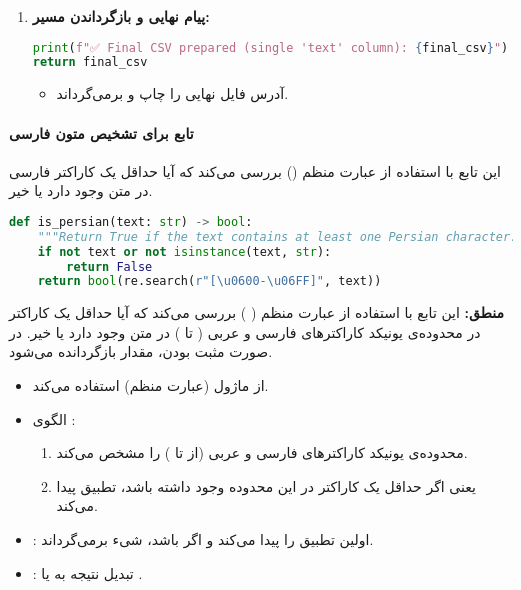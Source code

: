 \documentclass{article}
\begin{document}
\begin{enumerate}
    \item \textbf{پیام نهایی و بازگرداندن مسیر:}
    \begin{latin}
    \begin{lstlisting}[language=Python]
print(f"✅ Final CSV prepared (single 'text' column): {final_csv}")
return final_csv
    \end{lstlisting}
    \end{latin}
    \begin{itemize}
        \item آدرس فایل نهایی را چاپ و برمی‌گرداند.
    \end{itemize}
\end{enumerate}

\paragraph{تابع  برای تشخیص متون فارسی}

این تابع با استفاده از عبارت منظم () بررسی می‌کند که آیا حداقل یک کاراکتر فارسی در متن وجود دارد یا خیر.

\begin{latin}
\begin{lstlisting}[language=Python]
def is_persian(text: str) -> bool:
    """Return True if the text contains at least one Persian character."""
    if not text or not isinstance(text, str):
        return False
    return bool(re.search(r"[\u0600-\u06FF]", text))
\end{lstlisting}
\end{latin}
\textbf{منطق:} این تابع با استفاده از عبارت منظم (
) بررسی می‌کند که آیا حداقل یک کاراکتر در محدوده‌ی یونیکد کاراکترهای فارسی و عربی ( تا ) در متن وجود دارد یا خیر. در صورت مثبت بودن، مقدار  بازگردانده می‌شود.
\begin{itemize}
    \item از ماژول  (عبارت منظم) استفاده می‌کند.
    \item الگوی :
    \begin{enumerate}
        \item محدوده‌ی یونیکد کاراکترهای فارسی و عربی (از  تا ) را مشخص می‌کند.
        \item یعنی اگر حداقل یک کاراکتر در این محدوده وجود داشته باشد، تطبیق پیدا می‌کند.
    \end{enumerate}
    \item {}: اولین تطبیق را پیدا می‌کند و اگر باشد، شیء  برمی‌گرداند.
    \item {}: تبدیل نتیجه به  یا .
\end{itemize}
\end{document}
